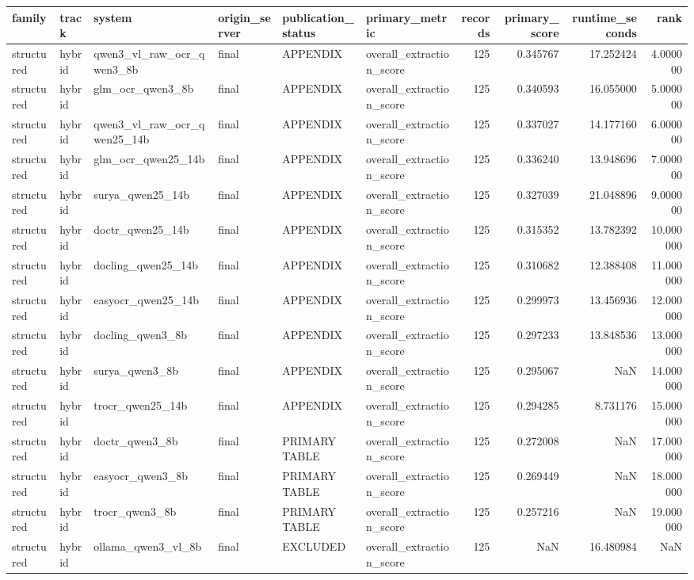 \begin{tabular}{llllllrrrr}
\toprule
family & track & system & origin\_server & publication\_status & primary\_metric & records & primary\_score & runtime\_seconds & rank \\
\midrule
structured & hybrid & qwen3\_vl\_raw\_ocr\_qwen3\_8b & final & APPENDIX & overall\_extraction\_score & 125 & 0.345767 & 17.252424 & 4.000000 \\
structured & hybrid & glm\_ocr\_qwen3\_8b & final & APPENDIX & overall\_extraction\_score & 125 & 0.340593 & 16.055000 & 5.000000 \\
structured & hybrid & qwen3\_vl\_raw\_ocr\_qwen25\_14b & final & APPENDIX & overall\_extraction\_score & 125 & 0.337027 & 14.177160 & 6.000000 \\
structured & hybrid & glm\_ocr\_qwen25\_14b & final & APPENDIX & overall\_extraction\_score & 125 & 0.336240 & 13.948696 & 7.000000 \\
structured & hybrid & surya\_qwen25\_14b & final & APPENDIX & overall\_extraction\_score & 125 & 0.327039 & 21.048896 & 9.000000 \\
structured & hybrid & doctr\_qwen25\_14b & final & APPENDIX & overall\_extraction\_score & 125 & 0.315352 & 13.782392 & 10.000000 \\
structured & hybrid & docling\_qwen25\_14b & final & APPENDIX & overall\_extraction\_score & 125 & 0.310682 & 12.388408 & 11.000000 \\
structured & hybrid & easyocr\_qwen25\_14b & final & APPENDIX & overall\_extraction\_score & 125 & 0.299973 & 13.456936 & 12.000000 \\
structured & hybrid & docling\_qwen3\_8b & final & APPENDIX & overall\_extraction\_score & 125 & 0.297233 & 13.848536 & 13.000000 \\
structured & hybrid & surya\_qwen3\_8b & final & APPENDIX & overall\_extraction\_score & 125 & 0.295067 & NaN & 14.000000 \\
structured & hybrid & trocr\_qwen25\_14b & final & APPENDIX & overall\_extraction\_score & 125 & 0.294285 & 8.731176 & 15.000000 \\
structured & hybrid & doctr\_qwen3\_8b & final & PRIMARY TABLE & overall\_extraction\_score & 125 & 0.272008 & NaN & 17.000000 \\
structured & hybrid & easyocr\_qwen3\_8b & final & PRIMARY TABLE & overall\_extraction\_score & 125 & 0.269449 & NaN & 18.000000 \\
structured & hybrid & trocr\_qwen3\_8b & final & PRIMARY TABLE & overall\_extraction\_score & 125 & 0.257216 & NaN & 19.000000 \\
structured & hybrid & ollama\_qwen3\_vl\_8b & final & EXCLUDED & overall\_extraction\_score & 125 & NaN & 16.480984 & NaN \\
\bottomrule
\end{tabular}
